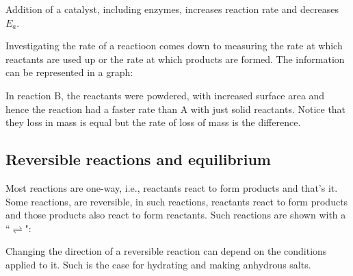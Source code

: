 Addition of a catalyst, including enzymes, increases reaction rate and decreases $E_a$.

Investigating the rate of a reactioon comes down to measuring the rate at which reactants are used
up or the rate at which products are formed. The information can be represented in a graph:

\begin{center}
\end{center}
In reaction B, the reactants were powdered, with increased surface area and hence the reaction had
a faster rate than A with just solid reactants. Notice that they loss in mass is equal but the rate
of loss of mass is the difference.

\subsection{Reversible reactions and equilibrium}
Most reactions are one-way, i.e., reactants react to form products and that's it. Some reactions,
are reversible, in such reactions, reactants react to form products and those products also react
to form reactants. Such reactions are shown with a ``$\rightleftharpoons$":

\begin{center}
\end{center}

Changing the direction of a reversible reaction can depend on the conditions applied to it.
Such is the case for hydrating and making anhydrous salts.

\begin{center}

\end{center}

